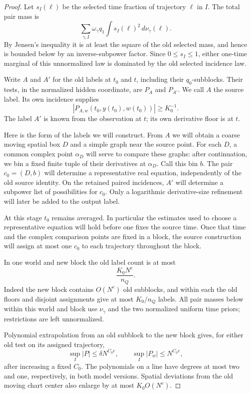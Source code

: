 \begin{proof}
Let \(s_I(\ell)\) be the selected time fraction of trajectory
\(\ell\) in \(I\). The total pair mass is
\[
 \sum_{\gamma,I}\omega_\gamma q_1
       \int s_I(\ell)^2\,d\nu_\gamma(\ell).
\]
By Jensen's inequality it is at least the square of the old
selected mass, and hence is bounded below by an inverse-subpower
factor. Since \(0\le s_I\le1\), either one-time marginal of
this unnormalized law is dominated by the old selected incidence law.

Write \(A\) and \(A'\) for the old labels at \(t_0\) and \(t\),
including their \(q_0\)-subblocks. Their tests, in the normalized
hidden coordinate, are \(P_A\) and \(P_{A'}\). We call \(A\) the
source label. Its own incidence supplies
\[
 |P_{A,w}(t_0,y(t_0),w(t_0))|\ge K_0^{-1}.
\]
The label \(A'\) is known from the observation at \(t\); its own
derivative floor is at \(t\).

Here is the form of the labels we will construct. From \(A\) we
will obtain a coarse moving spatial box \(D\) and a simple graph
near the source point. For each \(D\), a common complex point
\(\alpha_D\) will serve to compare these graphs: after continuation,
we bin a fixed finite tuple of their derivatives at \(\alpha_D\).
Call this bin \(b\). The pair \(c_0=(D,b)\) will determine a
representative real equation, independently of the old source
identity. On the retained paired incidences, \(A'\) will determine
a subpower list of possibilities for \(c_0\). Only a logarithmic
derivative-size refinement will later be added to the output label.

At this stage \(t_0\) remains averaged. In particular the estimates
used to choose a representative equation will hold before one fixes
the source time. Once that time and the complex comparison points
are fixed in a block, the source construction will assign at most
one \(c_0\) to each trajectory throughout the block.

In one world and new block the old label count is at most
\begin{equation}
 \frac{K_0N^e}{n_Q}.
 \label{a02:old-label-count}
\end{equation}
Indeed the new block contains \(O(N^e)\) old subblocks, and within
each the old floors and disjoint assignments give at most
\(K_0/n_Q\) labels. All pair masses below within this world and
block use \(\nu_\gamma\) and the two normalized uniform time
priors; restrictions are left unnormalized.

Polynomial extrapolation from an old subblock to the new block
gives, for either old test on its assigned trajectory,
\begin{equation}
 \sup_I|P|\le\delta N^{C_0e},
 \qquad
 \sup_I|P_w|\le N^{C_0e},
 \label{a02:old-test-extrapolation}
\end{equation}
after increasing a fixed \(C_0\).  The polynomials on a line have
degrees at most two and one, respectively, in both model versions.
Spatial deviations from the old moving chart center also enlarge
by at most \(K_0 O(N^e)\).


\end{proof}
